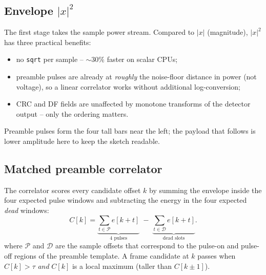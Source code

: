 \documentclass[11pt,a4paper]{article}
\begin{document}
\subsection{Envelope $|x|^{2}$}

The first stage takes the sample power stream.  Compared to $|x|$
(magnitude), $|x|^{2}$ has three practical benefits:
\begin{itemize}
  \item no \texttt{sqrt} per sample -- $\sim 30\%$ faster on scalar CPUs;
  \item preamble pulses are already at \emph{roughly} the noise-floor
        distance in power (not voltage), so a linear correlator works
        without additional log-conversion;
  \item CRC and DF fields are unaffected by monotone transforms of the
        detector output -- only the ordering matters.
\end{itemize}

\begin{center}
\end{center}

Preamble pulses form the four tall bars near the left; the payload that
follows is lower amplitude here to keep the sketch readable.

\subsection{Matched preamble correlator}\label{sec:corr}

The correlator scores every candidate offset $k$ by summing the
envelope inside the four expected pulse windows and subtracting the
energy in the four expected \emph{dead} windows:
\begin{equation}
C[k] = \underbrace{\sum_{t\in \mathcal{P}}\!e[k+t]}_{\text{4 pulses}}
     \;-\;
       \underbrace{\sum_{t\in \mathcal{D}}\!e[k+t]}_{\text{dead slots}} .
\end{equation}
where $\mathcal{P}$ and $\mathcal{D}$ are the sample offsets that
correspond to the pulse-on and pulse-off regions of the preamble
template. A frame candidate at $k$ passes when
$C[k] > \tau$ \emph{and} $C[k]$ is a local maximum
(taller than $C[k\pm 1]$).
\end{document}
